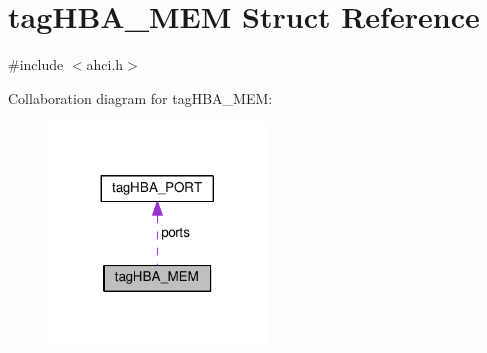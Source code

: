 \hypertarget{structtagHBA__MEM}{}\section{tag\+H\+B\+A\+\_\+\+M\+EM Struct Reference}
\label{structtagHBA__MEM}


{\ttfamily \#include $<$ahci.\+h$>$}



Collaboration diagram for tag\+H\+B\+A\+\_\+\+M\+EM\+:
\nopagebreak
\begin{figure}[H]
\begin{center}
\leavevmode
\includegraphics[width=164pt]{structtagHBA__MEM__coll__graph}
\end{center}
\end{figure}
